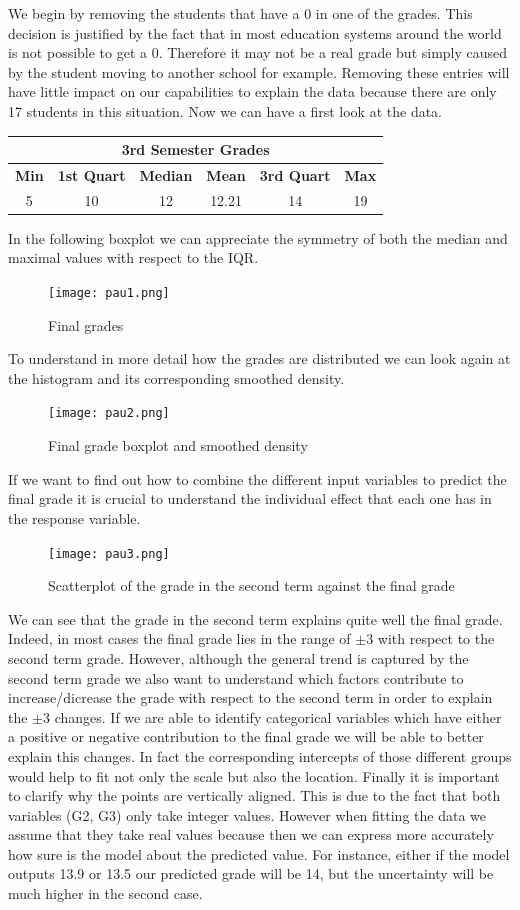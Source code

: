\documentclass[a4paper, 11pt]{article}
\theoremstyle{definition}
\numberwithin{equation}{section}		%
\numberwithin{table}{section}				%
\begin{document}
We begin by removing the students that have a 0 in one of the grades. This decision is justified by the fact that in most education systems around the world is not possible to get a 0. Therefore it may not be a real grade but simply caused by the student moving to another school for example.  Removing these entries will have little impact on our capabilities to explain the data because there are only 17 students in this situation. Now we can have a first look at the data.\bigskip
\begin{center}
\begin{tabular}{ |c|c|c|c|c|c|  }
 \hline
 \multicolumn{6}{|c|}{3rd Semester Grades} \\
 \hline
\textbf{Min} & \textbf{1st Quart} & \textbf{Median} & \textbf{Mean} &  \textbf{3rd Quart} & \textbf{Max}\\
\hline
 5   & 10   & 12 &  12.21 &14&   19\\
 \hline
\end{tabular}
\end{center}
\bigskip In the following boxplot we can appreciate the symmetry of both the median and maximal values with respect to the IQR.
\begin{figure}[h]\centering
\texttt{[image: pau1.png]}
\caption{Final grades}
\end{figure}
\newpage
To understand in more detail how the grades are distributed we can look again at the histogram and  its corresponding smoothed density. \bigskip
\begin{figure}[h]\centering
\texttt{[image: pau2.png]}
\caption{Final grade boxplot and smoothed density}
\end{figure}
If we want to find out how to combine the different input variables to predict the final grade it is crucial to understand the individual effect that each one has in the response variable.
\begin{figure}[h]\centering
\texttt{[image: pau3.png]}
\caption{Scatterplot of the grade in the second term against the final grade}
\end{figure}
\newline
We can see that the grade in the second term explains quite well the final grade. Indeed, in most cases the final grade lies in the range of $\pm 3$ with respect to the second term grade. However, although the general trend is captured by the second term grade we also want to understand which factors contribute to increase/dicrease the grade with respect to the second term in order to explain the $\pm 3$ changes. If we are able to identify categorical variables which have either a positive or negative contribution to the final grade we will be able to better explain this changes. In fact the corresponding intercepts of those different groups would help to fit not only the scale but also the location.
Finally it is important to clarify why the points are vertically aligned. This is due to the fact that both variables (G2, G3) only take integer values. However when fitting the data we assume that they take real values because then we can express more accurately how sure is the model about the predicted value. For instance, either if the model outputs 13.9 or 13.5 our predicted grade will be 14, but the uncertainty will be much higher in the second case.\bigskip
\end{document}
